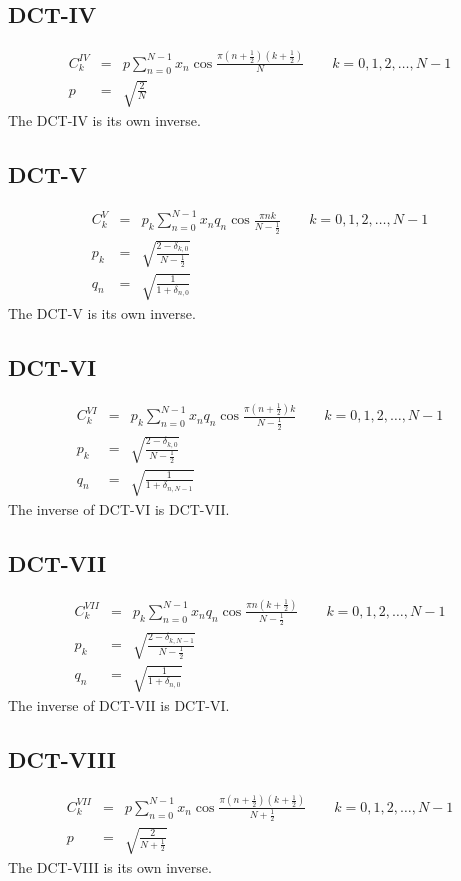 \documentclass{article}
\begin{document}
\subsection{DCT-IV}
\begin{eqnarray*}
C^{IV}_k&=&p \sum _{n=0}^{N-1} x_n \cos \frac{\pi \left(n+\frac{1}{2}\right) \left(k+\frac{1}{2}\right)}{N} \quad \quad k=0, 1, 2, \dots, N-1\\
p&=&\sqrt{\frac{2}{N}}
\end{eqnarray*}
The DCT-IV is its own inverse.

\subsection{DCT-V}
\begin{eqnarray*}
C^V_k&=&p_k \sum _{n=0}^{N-1} x_n q_n \cos \frac{\pi n k}{N-\frac{1}{2}} \quad \quad k=0, 1, 2, \dots, N-1\\
p_k&=&\sqrt{\frac{2-\delta _{k,0}}{N-\frac{1}{2}}}\\
q_n&=&\sqrt{\frac{1}{1+\delta _{n,0}}}
\end{eqnarray*}
The DCT-V is its own inverse.

\subsection{DCT-VI}
\begin{eqnarray*}
C^{VI}_k&=&p_k \sum _{n=0}^{N-1} x_n q_n \cos \frac{\pi \left(n+\frac{1}{2}\right) k}{N-\frac{1}{2}} \quad \quad k=0, 1, 2, \dots, N-1\\
p_k&=&\sqrt{\frac{2-\delta _{k,0}}{N-\frac{1}{2}}}\\
q_n&=&\sqrt{\frac{1}{1+\delta _{n,N-1}}}
\end{eqnarray*}
The inverse of DCT-VI is DCT-VII.

\subsection{DCT-VII}
\begin{eqnarray*}
C^{VII}_k&=&p_k \sum _{n=0}^{N-1} x_n q_n \cos \frac{\pi n \left(k+\frac{1}{2}\right)}{N-\frac{1}{2}} \quad \quad k=0, 1, 2, \dots, N-1\\
p_k&=&\sqrt{\frac{2-\delta _{k,N-1}}{N-\frac{1}{2}}}\\
q_n&=&\sqrt{\frac{1}{1+\delta _{n,0}}}
\end{eqnarray*}
The inverse of DCT-VII is DCT-VI.

\subsection{DCT-VIII}
\begin{eqnarray*}
C^{VII}_k&=&p \sum _{n=0}^{N-1} x_n \cos \frac{\pi \left(n+\frac{1}{2}\right) \left(k+\frac{1}{2}\right)}{N+\frac{1}{2}} \quad \quad k=0, 1, 2, \dots, N-1\\
p&=&\sqrt{\frac{2}{N+\frac{1}{2}}}
\end{eqnarray*}
The DCT-VIII is its own inverse.
\end{document}
